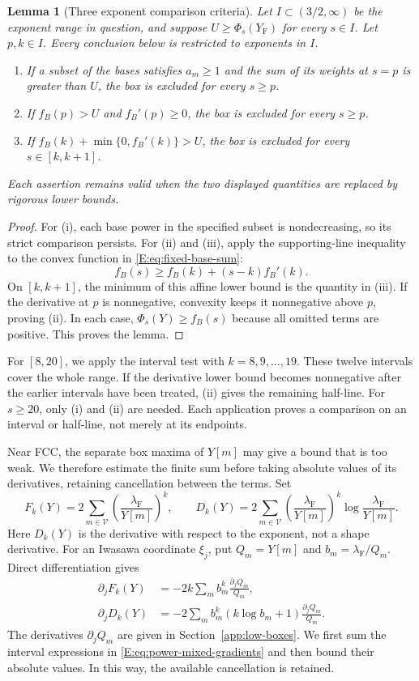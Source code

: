 \documentclass[reqno,english]{amsart}
\newtheorem{lemma}[theorem]{Lemma}
\theoremstyle{definition}
\newtheorem{open problem}[theorem]{Open Problem}
\theoremstyle{remark}
\theoremstyle{plain}
\numberwithin{equation}{section}
\newcommand{\YF}{Y_{\mathrm F}}
\newcommand{\lam}{\lambda_{\mathrm F}}
\begin{document}
\begin{lemma}[Three exponent comparison criteria]\label{E:lem:power-certificates}
Let $I\subset(3/2,\infty)$ be the exponent range in question, and suppose
$U\ge\Phi_s(\YF)$ for every $s\in I$. Let $p,k\in I$.
Every conclusion below is restricted to exponents in $I$.
\begin{enumerate}\renewcommand{\labelenumi}{(\roman{enumi})}
\item If a subset of the bases satisfies $a_m\ge1$ and the sum of its weights at $s=p$ is greater than $U$, the box is excluded for every $s\ge p$.
\item If $f_B(p)>U$ and $f_B'(p)\ge0$, the box is excluded for every $s\ge p$.
\item If $f_B(k)+\min\{0,f_B'(k)\}>U$, the box is excluded for every $s\in[k,k+1]$.
\end{enumerate}
Each assertion remains valid when the two displayed quantities are replaced by rigorous lower bounds.
\end{lemma}
\begin{proof}
For (i), each base power in the specified subset is nondecreasing,
so its strict comparison persists. For (ii) and (iii), apply the supporting-line
inequality to the convex function in \eqref{E:eq:fixed-base-sum}:
\[
 f_B(s)\ge f_B(k)+(s-k)f_B'(k).
\]
On $[k,k+1]$, the minimum of this affine lower bound is the
quantity in (iii). If the derivative at $p$ is nonnegative,
convexity keeps it nonnegative above $p$, proving
(ii). In each case, $\Phi_s(Y)\ge f_B(s)$ because all omitted
terms are positive. This proves the lemma.
\end{proof}

For $[8,20]$, we apply the interval test with
$k=8,9,\ldots,19$. These twelve intervals cover the whole range.
If the derivative lower bound becomes nonnegative after the earlier
intervals have been treated, (ii) gives the remaining half-line.
For $s\ge20$, only (i) and (ii) are needed. Each application proves
a comparison on an interval or half-line, not merely at its endpoints.


Near FCC, the separate box maxima of $Y[m]$ may give a bound
that is too weak. We therefore estimate the finite sum before taking
absolute values of its derivatives, retaining cancellation between
the terms. Set
\[
 F_k(Y)=2\sum_{m\in\mathcal V}\left(\frac{\lam}{Y[m]}\right)^k,
 \qquad
 D_k(Y)=2\sum_{m\in\mathcal V}\left(\frac{\lam}{Y[m]}\right)^k
                   \log\frac{\lam}{Y[m]}.
\]
Here $D_k(Y)$ is the derivative with respect to the exponent,
not a shape derivative. For an Iwasawa coordinate $\xi_j$, put
$Q_m=Y[m]$ and $b_m=\lam/Q_m$. Direct differentiation gives
\begin{align}
 \partial_jF_k(Y)
 &=-2k\sum_m b_m^k\frac{\partial_jQ_m}{Q_m},\nonumber\\
 \partial_jD_k(Y)
 &=-2\sum_m b_m^k(k\log b_m+1)
                 \frac{\partial_jQ_m}{Q_m}.
 \label{E:eq:power-mixed-gradients}
\end{align}
The derivatives $\partial_jQ_m$ are given in
Section~\ref{app:low-boxes}. We first sum the interval expressions
in \eqref{E:eq:power-mixed-gradients} and then bound their absolute
values. In this way, the available cancellation is retained.
\end{document}
